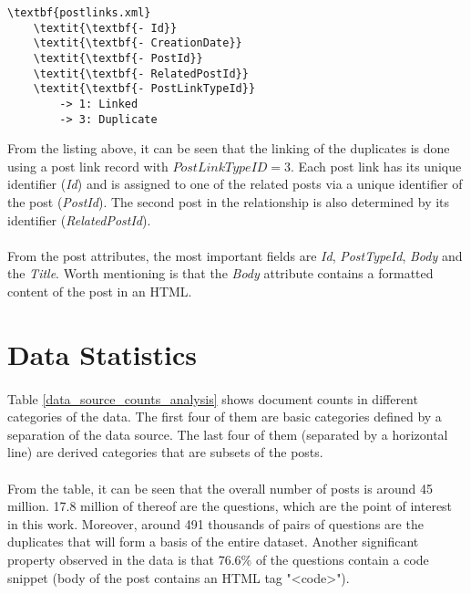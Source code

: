 \begin{Verbatim}[commandchars=\\\{\},codes={\catcode`$=3\catcode`_=8}]
\textbf{postlinks.xml}
	\textit{\textbf{- Id}}
	\textit{\textbf{- CreationDate}}
	\textit{\textbf{- PostId}}
	\textit{\textbf{- RelatedPostId}}
	\textit{\textbf{- PostLinkTypeId}}
		-> 1: Linked
		-> 3: Duplicate
\end{Verbatim}

From the listing above, it can be seen that the linking of the duplicates is done using a post link record with $PostLinkTypeID = 3$. Each post link has its unique identifier (\textit{Id}) and is assigned to one of the related posts via a unique identifier of the post (\textit{PostId}). The second post in the relationship is also determined by its identifier (\textit{RelatedPostId}). 

\paragraph{}
From the post attributes, the most important fields are \textit{Id}, \textit{PostTypeId}, \textit{Body} and the \textit{Title}. Worth mentioning is that the \textit{Body} attribute contains a formatted content of the post in an HTML.

\section{Data Statistics}
\paragraph{}
Table \ref{data_source_counts_analysis} shows document counts in different categories of the data. The first four of them are basic categories defined by a separation of the data source. The last four of them (separated by a horizontal line) are derived categories that are subsets of the posts.

\paragraph{}
From the table, it can be seen that the overall number of posts is around 45 million. 17.8 million of thereof are the questions, which are the point of interest in this work. Moreover, around 491 thousands of pairs of questions are the duplicates that will form a basis of the entire dataset. Another significant property observed in the data is that $76.6\%$ of the questions contain a code snippet (body of the post contains an HTML tag "<code>").

